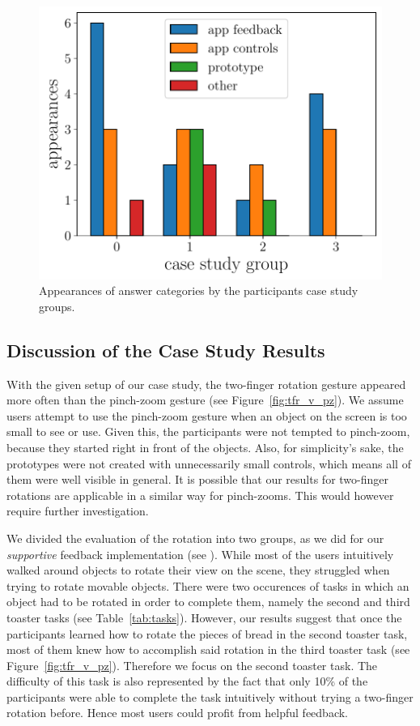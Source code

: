 \documentclass[manuscript]{acmart}
\begin{document}
			\begin{figure}[H]
				\centering
				\includegraphics[width=.49\textwidth]{img/plot/plot_tags_implementations.pdf}
				\caption{Appearances of answer categories by the participants case study groups.}
				\label{fig:tags_imp}
			\end{figure}

		\subsection{Discussion of the Case Study Results}\label{ssec:discussion}
			With the given setup of our case study, the two-finger rotation gesture appeared more often than the pinch-zoom gesture (see Figure~\ref{fig:tfr_v_pz}). We assume users attempt to use the pinch-zoom gesture when an object on the screen is too small to see or use. Given this, the participants were not tempted to pinch-zoom, because they started right in front of the objects. Also, for simplicity's sake, the prototypes were not created with unnecessarily small controls, which means all of them were well visible in general. It is possible that our results for two-finger rotations are applicable in a similar way for pinch-zooms. This would however require further investigation.

			We divided the evaluation of the rotation into two groups, as we did for our \emph{supportive} feedback implementation (see \emph{}). While most of the users intuitively walked around objects to rotate their view on the scene, they struggled when trying to rotate movable objects. There were two occurences of tasks in which an object had to be rotated in order to complete them, namely the second and third toaster tasks (see Table~\ref{tab:tasks}). However, our results suggest that once the participants learned how to rotate the pieces of bread in the second toaster task, most of them knew how to accomplish said rotation in the third toaster task (see Figure~\ref{fig:tfr_v_pz}). Therefore we focus on the second toaster task. The difficulty of this task is also represented by the fact that only 10\% of the participants were able to complete the task intuitively without trying a two-finger rotation before. Hence most users could profit from helpful feedback.
\end{document}
